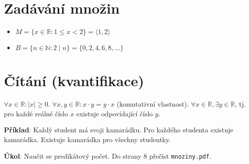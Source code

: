 \documentclass{article}
\begin{document}
\section{Zadávání množin}
\begin{itemize}
    \item \(M = \{ x \in \mathbb{R} : 1 \leq x < 2 \} = \langle 1, 2 \rangle\)
    \item \(B = \{ n \in \mathbb{N} : 2 \mid n \} = \{0, 2, 4, 6, 8, \dots\}\)
\end{itemize}

\section{Čítání (kvantifikace)}
\(\forall x \in \mathbb{R} : |x| \geq 0\).
\(\forall x, y \in \mathbb{R} : x \cdot y = y \cdot x\) (komutativní vlastnost).
\(\forall x \in \mathbb{R}, \exists y \in \mathbb{R}\), tj. pro každé reálné číslo \(x\) existuje odpovídající číslo \(y\).

\textbf{Příklad}:
Každý student má svoji kamarádku.
Pro každého studenta existuje kamarádka.
Existuje kamarádka pro všechny studentky.

\textbf{Úkol}:
Naučit se predikátový počet.
Do strany 8 přečíst \texttt{mnoziny.pdf}.
\end{document}
